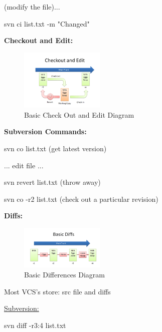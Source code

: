 \documentclass{article}
\begin{document}
\begin{flushedleft}
(modify the file)... \par

svn ci list.txt -m "Changed" \\
\par

\textbf{Checkout and Edit:} \\
\par

\begin{figure}[htp]
\centering
\includegraphics[width=4cm]{CheckOutAndEdit.png}
\caption{Basic Check Out and Edit Diagram}
\label{fig:BCOEDiagram}
\end{figure} 

\textbf{Subversion Commands:} \\
\par

svn co list.txt (get latest version) \par
... edit file ... \par
svn revert list.txt (throw away) \par
svn co -r2 list.txt (check out a particular revision) \\
\par

\textbf{Diffs:} \\
\par

\begin{figure}[htp]
\centering
\includegraphics[width=4cm]{Diff.png}
\caption{Basic Differences Diagram}
\label{fig:BDDiagram}
\end{figure} 

Most VCS's store: src file and diffs

\underline{Subversion:} \\
\par

svn diff -r3:4 list.txt \\
\par


\end{flushedleft}
\end{document}
